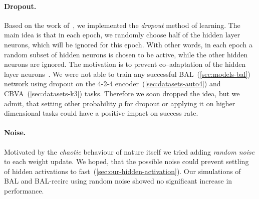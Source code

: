 


\paragraph{Dropout.}
\label{sec:sim-our-dropout}
Based on the work of~\citet{hinton2012improving}, we implemented the \emph{dropout} method of learning. The main idea is that in each epoch, we randomly choose half of the hidden layer neurons, which will be ignored for this epoch. With other words, in each epoch a random subset of hidden neurons is chosen to be active, while the other hidden neurons are ignored. The motivation is to prevent co--adaptation of the hidden layer neurons~\citep{hinton2012improving}. We were not able to train any successful BAL~(\ref{sec:models-bal}) network using dropout on the 4-2-4 encoder~(\ref{sec:datasets-auto4}) and CBVA~(\ref{sec:datasets-k3}) tasks. Therefore we soon dropped the idea, but we admit, that setting other probability $p$ for dropout or applying it on higher dimensional tasks could have a positive impact on success rate. 

\paragraph{Noise.} 
\label{sec:sim-our-noise} 

Motivated by the \emph{chaotic} behaviour of nature itself we tried adding \emph{random noise} to each weight update. We hoped, that the possible noise could prevent settling of hidden activations to fast~(\ref{sec:our-hidden-activation}). Our simulations of BAL and BAL-recirc using random noise showed no significant increase in performance. %


